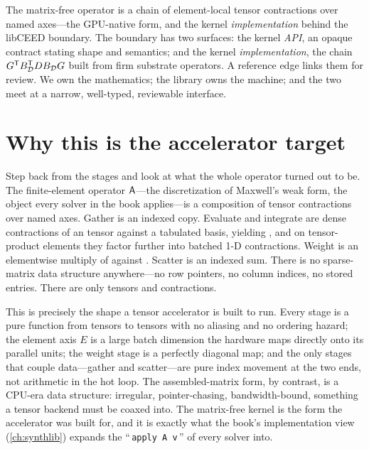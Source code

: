 \begin{keyidea}
The matrix-free operator is a chain of element-local tensor contractions over named
axes---the GPU-native form, and the kernel \emph{implementation} behind the libCEED
boundary. The boundary has two surfaces: the kernel \emph{API}, an opaque
 contract stating shape and semantics; and the kernel
\emph{implementation}, the chain $G^{\mathsf T}B_{\mathcal{D}}^{\mathsf T}D B_{\mathcal{D}}G$
built from firm substrate operators. A  reference edge
links them for review. We own the mathematics; the library owns the machine; and
the two meet at a narrow, well-typed, reviewable interface.
\end{keyidea}

\section{Why this is the accelerator target}
\label{sec:appk-gpu}

Step back from the stages and look at what the whole operator turned out to be. The
finite-element operator $\mathsf{A}$---the discretization of Maxwell's weak form, the
object every solver in the book applies---is a composition of tensor contractions
over named axes. Gather is an indexed copy. Evaluate and integrate are dense
contractions of an \code{[(E, L)]} tensor against a tabulated basis, yielding
\code{[(E, P, C)]}, and on tensor-product elements they factor further into batched
1-D contractions. Weight is an elementwise multiply of \code{[(E, P, C)]} against
\code{[(E, P, G)]}. Scatter is an indexed sum. There is no sparse-matrix data
structure anywhere---no row pointers, no column indices, no stored entries. There
are only tensors and contractions.

This is precisely the shape a tensor accelerator is built to run. Every stage is a
pure function from tensors to tensors with no aliasing and no ordering hazard; the
element axis $E$ is a large batch dimension the hardware maps directly onto its
parallel units; the weight stage is a perfectly diagonal map; and the only stages
that couple data---gather and scatter---are pure index movement at the two ends,
not arithmetic in the hot loop. The assembled-matrix form, by contrast, is a
CPU-era data structure: irregular, pointer-chasing, bandwidth-bound, something a
tensor backend must be coaxed into. The matrix-free kernel is the form the
accelerator was built for, and it is exactly what the book's implementation view
(\cref{ch:synthlib}) expands the ``\,\lstinline[style=l4style]|apply A v|\,'' of
every solver into.

